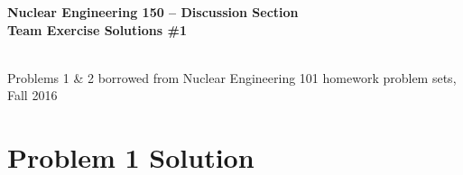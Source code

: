 \documentclass{report}
\begin{document}
\begin{center}
\textbf{\large Nuclear Engineering 150 -- Discussion Section}\\ 
\textbf{Team Exercise Solutions \#1}

\-\\
{\small *Problems 1 \& 2 borrowed from Nuclear Engineering 101 homework problem sets, Fall 2016}
\end{center}


\section*{Problem 1 Solution}



\end{document}

